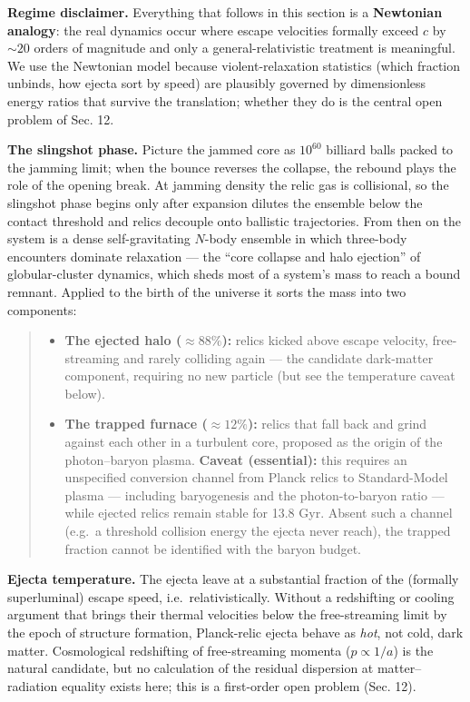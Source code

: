 \documentclass[
]{article}
\providecommand{\tightlist}{%
  \setlength{\itemsep}{0pt}\setlength{\parskip}{0pt}}
\begin{document}
\textbf{Regime disclaimer.} Everything that follows in this section is a
\textbf{Newtonian analogy}: the real dynamics occur where escape
velocities formally exceed \(c\) by \(\sim\!20\) orders of magnitude and
only a general-relativistic treatment is meaningful. We use the
Newtonian model because violent-relaxation statistics (which fraction
unbinds, how ejecta sort by speed) are plausibly governed by
dimensionless energy ratios that survive the translation; whether they
do is the central open problem of Sec. 12.

\textbf{The slingshot phase.} Picture the jammed core as \(10^{60}\)
billiard balls packed to the jamming limit; when the bounce reverses the
collapse, the rebound plays the role of the opening break. At jamming
density the relic gas is collisional, so the slingshot phase begins only
after expansion dilutes the ensemble below the contact threshold and
relics decouple onto ballistic trajectories. From then on the system is
a dense self-gravitating \(N\)-body ensemble in which three-body
encounters dominate relaxation --- the ``core collapse and halo
ejection'' of globular-cluster dynamics, which sheds most of a system's
mass to reach a bound remnant. Applied to the birth of the universe it
sorts the mass into two components:

\begin{quote}
\begin{itemize}
\tightlist
\item
  \textbf{The ejected halo (\(\approx 88\%\)):} relics kicked above
  escape velocity, free-streaming and rarely colliding again --- the
  candidate dark-matter component, requiring no new particle (but see
  the temperature caveat below).
\item
  \textbf{The trapped furnace (\(\approx 12\%\)):} relics that fall back
  and grind against each other in a turbulent core, proposed as the
  origin of the photon--baryon plasma. \textbf{Caveat (essential):} this
  requires an unspecified conversion channel from Planck relics to
  Standard-Model plasma --- including baryogenesis and the
  photon-to-baryon ratio --- while ejected relics remain stable for 13.8
  Gyr. Absent such a channel (e.g.~a threshold collision energy the
  ejecta never reach), the trapped fraction cannot be identified with
  the baryon budget.
\end{itemize}
\end{quote}

\textbf{Ejecta temperature.} The ejecta leave at a substantial fraction
of the (formally superluminal) escape speed, i.e.~relativistically.
Without a redshifting or cooling argument that brings their thermal
velocities below the free-streaming limit by the epoch of structure
formation, Planck-relic ejecta behave as \emph{hot}, not cold, dark
matter. Cosmological redshifting of free-streaming momenta
(\(p \propto 1/a\)) is the natural candidate, but no calculation of the
residual dispersion at matter--radiation equality exists here; this is a
first-order open problem (Sec. 12).
\end{document}
